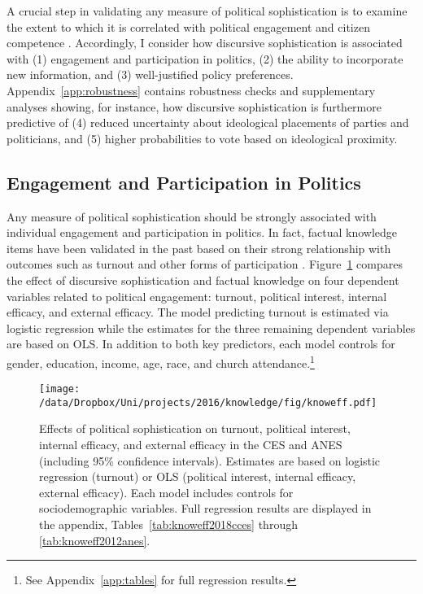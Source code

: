 A crucial step in validating any measure of political sophistication is to examine the extent to which it is correlated with political engagement and citizen competence \citep{lupia2006elitism,lupia2015uninformed}. Accordingly, I consider how discursive sophistication is associated with (1) engagement and participation in politics, (2) the ability to incorporate new information, and (3) well-justified policy preferences. Appendix~\ref{app:robustness} contains robustness checks and supplementary analyses showing, for instance, how discursive sophistication is furthermore predictive of (4) reduced uncertainty about ideological placements of parties and politicians, and (5) higher probabilities to vote based on ideological proximity.


\subsection*{Engagement and Participation in Politics}
Any measure of political sophistication should be strongly associated with individual engagement and participation in politics. In fact, factual knowledge items have been validated in the past based on their strong relationship with outcomes such as turnout and other forms of participation \citep[230--233]{lupia2015uninformed}. Figure~\ref{fig:knoweff} compares the effect of discursive sophistication and factual knowledge on four dependent variables related to political engagement: turnout, political interest, internal efficacy, and external efficacy. The model predicting turnout is estimated via logistic regression while the estimates for the three remaining dependent variables are based on OLS. In addition to both key predictors, each model controls for gender, education, income, age, race, and church attendance.\footnote{See Appendix~\ref{app:tables} for full regression results.}

\begin{figure}[h]\centering
\texttt{[image: /data/Dropbox/Uni/projects/2016/knowledge/fig/knoweff.pdf]}
\caption[Effects of political sophistication on turnout, political interest, internal efficacy, and external efficacy]{Effects of political sophistication on turnout, political interest, internal efficacy, and external efficacy in the CES and ANES (including 95\% confidence intervals). Estimates are based on logistic regression (turnout) or OLS (political interest, internal efficacy, external efficacy). Each model includes controls for sociodemographic variables. Full regression results are displayed in the appendix, Tables~\ref{tab:knoweff2018cces} through \ref{tab:knoweff2012anes}.}\label{fig:knoweff}
\end{figure}

